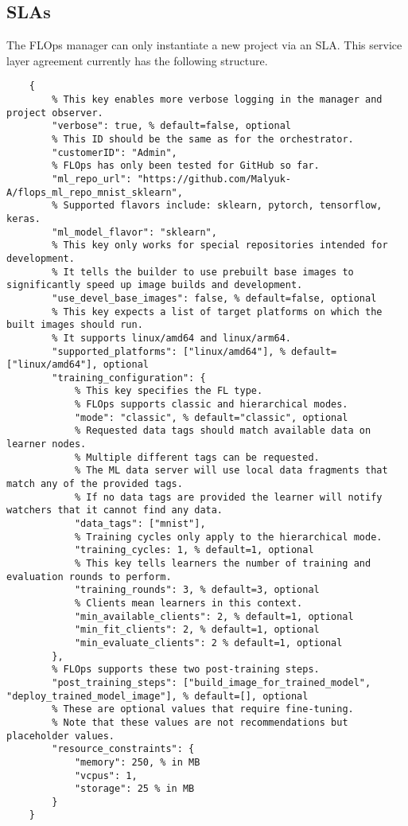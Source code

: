 \pagebreak
\subsection{SLAs} \label{subsection:SLAs}
The FLOps manager can only instantiate a new project via an SLA.
This service layer agreement currently has the following structure.

\begin{lstlisting}
    {
        % This key enables more verbose logging in the manager and project observer.
        "verbose": true, % default=false, optional
        % This ID should be the same as for the orchestrator.
        "customerID": "Admin", 
        % FLOps has only been tested for GitHub so far.
        "ml_repo_url": "https://github.com/Malyuk-A/flops_ml_repo_mnist_sklearn",
        % Supported flavors include: sklearn, pytorch, tensorflow, keras.
        "ml_model_flavor": "sklearn",
        % This key only works for special repositories intended for development.
        % It tells the builder to use prebuilt base images to significantly speed up image builds and development.
        "use_devel_base_images": false, % default=false, optional
        % This key expects a list of target platforms on which the built images should run.
        % It supports linux/amd64 and linux/arm64.
        "supported_platforms": ["linux/amd64"], % default=["linux/amd64"], optional
        "training_configuration": {
            % This key specifies the FL type.
            % FLOps supports classic and hierarchical modes.
            "mode": "classic", % default="classic", optional
            % Requested data tags should match available data on learner nodes.
            % Multiple different tags can be requested.
            % The ML data server will use local data fragments that match any of the provided tags.
            % If no data tags are provided the learner will notify watchers that it cannot find any data.
            "data_tags": ["mnist"],
            % Training cycles only apply to the hierarchical mode.
            "training_cycles: 1, % default=1, optional
            % This key tells learners the number of training and evaluation rounds to perform.
            "training_rounds": 3, % default=3, optional
            % Clients mean learners in this context.
            "min_available_clients": 2, % default=1, optional
            "min_fit_clients": 2, % default=1, optional
            "min_evaluate_clients": 2 % default=1, optional
        },
        % FLOps supports these two post-training steps.
        "post_training_steps": ["build_image_for_trained_model", "deploy_trained_model_image"], % default=[], optional
        % These are optional values that require fine-tuning.
        % Note that these values are not recommendations but placeholder values.
        "resource_constraints": {
            "memory": 250, % in MB
            "vcpus": 1,
            "storage": 25 % in MB
        }
    }
\end{lstlisting}

